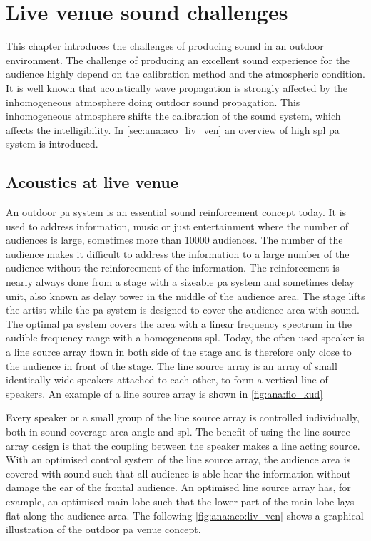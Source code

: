 \section{Live venue sound challenges}
This chapter introduces the challenges of producing sound in an outdoor environment. The challenge of producing an excellent sound experience for the audience highly depend on the calibration method and the atmospheric condition. It is well known that acoustically wave propagation is strongly affected by the inhomogeneous atmosphere doing outdoor sound propagation. This inhomogeneous atmosphere shifts the calibration of the sound system, which affects the intelligibility. In \autoref{sec:ana:aco_liv_ven} an overview of high \gls{spl} \gls{pa} system is introduced.



\subsection{Acoustics at live venue}\label{sec:ana:aco_liv_ven}
An outdoor \gls{pa} system is an essential sound reinforcement concept today. It is used to address information, music or just entertainment where the number of audiences is large, sometimes more than 10000 audiences. The number of the audience makes it difficult to address the information to a large number of the audience without the reinforcement of the information. The reinforcement is nearly always done from a stage with a sizeable \gls{pa} system and sometimes delay unit, also known as delay tower in the middle of the audience area. The stage lifts the artist while the \gls{pa} system is designed to cover the audience area with sound. The optimal \gls{pa} system covers the area with a linear frequency spectrum in the audible frequency range with a homogeneous \gls{spl}. Today, the often used speaker is a line source array flown in both side of the stage and is therefore only close to the audience in front of the stage. The line source array is an array of small identically wide speakers attached to each other, to form a vertical line of speakers. An example of a line source array is shown in \autoref{fig:ana:flo_kud}


Every speaker or a small group of the line source array is controlled individually, both in sound coverage area angle and \gls{spl}. The benefit of using the line source array design is that the coupling between the speaker makes a line acting source. With an optimised control system of the line source array, the audience area is covered with sound such that all audience is able hear the information without damage the ear of the frontal audience. An optimised line source array has, for example, an optimised main lobe such that the lower part of the main lobe lays flat along the audience area.
The following \autoref{fig:ana:aco:liv_ven} shows a graphical illustration of the outdoor \gls{pa} venue concept.

